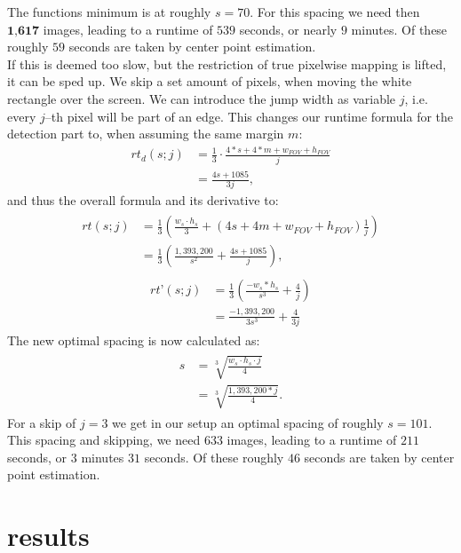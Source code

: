 \documentclass[journal,final,a4paper,twoside]{PS}
\begin{document}
The functions minimum is at roughly $s = 70$. For this spacing we need then $\textbf{1,617}$ images, leading to a runtime of $539$ seconds, or nearly $9$ minutes. Of these roughly $59$ seconds are taken by center point estimation.\\
If this is deemed too slow, but the restriction of true pixelwise mapping is lifted, it can be sped up. We skip a set amount of pixels, when moving the white rectangle over the screen. We can introduce the jump width as variable $j$, i.e. every $j$--th pixel will be part of an edge. This changes our runtime formula for the detection part to, when assuming the same margin $m$:
\begin{align}
rt_d (s; j) &=\frac{1}{3} \cdot \frac{4*s + 4 * m + w_{FOV} + h_{FOV}}{j}\\
 &= \frac{4s + 1085}{3j},
\end{align}
and thus the overall formula and its derivative to:
\begin{align}\begin{split}
rt(s; j) &= \frac{1}{3} \left(\frac{w_s\cdot h_s}{3} + \left( 4s + 4m + w_{FOV} + h_{FOV}\right)\frac{1}{j}\right)\\ &=\frac{1}{3}\left( \frac{1,393,200}{s^2} + \frac{4s +1085}{j}\right),\end{split}
\end{align}
\begin{align}\begin{split}
rt’(s; j) &= \frac{1}{3} \left(\frac{-w_s * h_s}{s^3} + \frac{4}{j}\right)\\& =\frac{-1,393,200 }{3s^3} + \frac{4}{3j} \end{split}
\end{align}
The new optimal spacing is now calculated as:
\begin{align}\begin{split}
s &= \sqrt[3]{\frac{w_s \cdot h_s \cdot j }{ 4}} \\&= \sqrt[3]{\frac{1,393,200 * j} { 4}}.\end{split}
\end{align}
For a skip of $j = 3$ we get in our setup an optimal spacing of roughly $s = 101$. This spacing and skipping, we need $633$ images, leading to a runtime of $211$ seconds, or $3$ minutes $31$ seconds. Of these roughly $46$ seconds are taken by center point estimation.




\section{results}
\label{sec:results}
\end{document}
